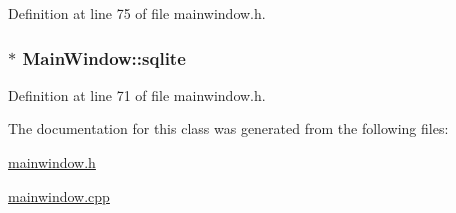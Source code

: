\-Definition at line 75 of file mainwindow.\-h.

\hypertarget{classMainWindow_acd9e528f003b22f3c17657a89505803a}{
\subsubsection[{sqlite}]{$\ast$ {\bf \-Main\-Window\-::sqlite}}}\label{classMainWindow_acd9e528f003b22f3c17657a89505803a}


\-Definition at line 71 of file mainwindow.\-h.



\-The documentation for this class was generated from the following files\-:\begin{DoxyCompactItemize}
\item 
\hyperlink{mainwindow_8h}{mainwindow.\-h}\item 
\hyperlink{mainwindow_8cpp}{mainwindow.\-cpp}\end{DoxyCompactItemize}
